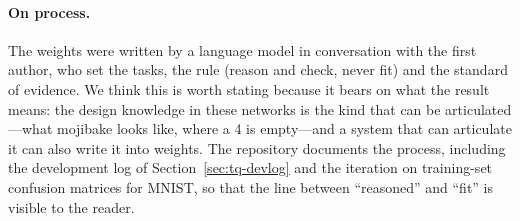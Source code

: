 \paragraph{On process.} The weights were written by a language model in conversation with
the first author, who set the tasks, the rule (reason and check, never fit) and the
standard of evidence. We think this is worth stating because it bears on what the result
means: the design knowledge in these networks is the kind that can be articulated---what
mojibake looks like, where a 4 is empty---and a system that can articulate it can also
write it into weights. The repository documents the process, including the development
log of Section~\ref{sec:tq-devlog} and the iteration on training-set confusion matrices
for MNIST, so that the line between ``reasoned'' and ``fit'' is visible to the reader.

